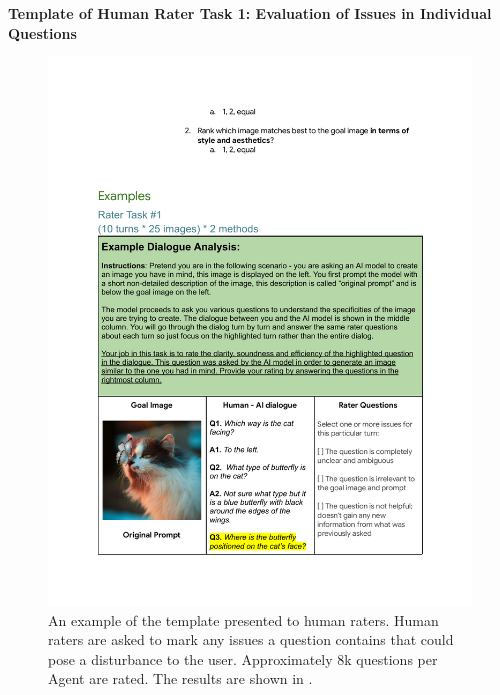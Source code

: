 \clearpage
\textbf{Template of Human Rater Task 1: Evaluation of Issues in Individual Questions} 
\begin{figure} [H]
    \centering
    \includegraphics[width=.9\linewidth]{figures/Task_1.pdf}
    \caption{An example of the template presented to human raters. Human raters are asked to mark any issues a question contains that could pose a disturbance to the user. Approximately 8k questions per Agent are rated. The results are shown in .}
    \label{fig:interface-human-model-task-1}
\end{figure} 
\clearpage

